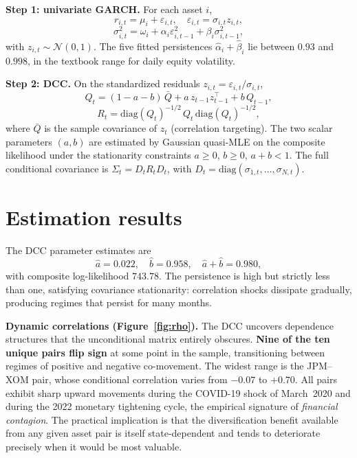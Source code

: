 \documentclass[a4paper,9pt,twocolumn]{extarticle}
\begin{document}
\textbf{Step 1: univariate GARCH.} For each asset $i$,
\begin{equation*}
r_{i,t} = \mu_i + \varepsilon_{i,t}, \quad \varepsilon_{i,t} = \sigma_{i,t} z_{i,t},
\end{equation*}
\begin{equation*}
\sigma_{i,t}^2 = \omega_i + \alpha_i\varepsilon_{i,t-1}^2 + \beta_i\sigma_{i,t-1}^2,
\end{equation*}
with $z_{i,t} \sim \mathcal{N}(0,1)$. The five fitted persistences $\hat\alpha_i + \hat\beta_i$ lie between $0.93$ and $0.998$, in the textbook range for daily equity volatility.

\textbf{Step 2: DCC.} On the standardized residuals $z_{i,t} = \varepsilon_{i,t}/\sigma_{i,t}$,
\begin{equation*}
Q_t = (1-a-b)\,\bar Q + a\, z_{t-1} z_{t-1}^{\top} + b\, Q_{t-1},
\end{equation*}
\begin{equation*}
R_t = \mathrm{diag}(Q_t)^{-1/2}\, Q_t\, \mathrm{diag}(Q_t)^{-1/2},
\end{equation*}
where $\bar Q$ is the sample covariance of $z_t$ (correlation targeting). The two scalar parameters $(a,b)$ are estimated by Gaussian quasi-MLE on the composite likelihood under the stationarity constraints $a\geq 0$, $b\geq 0$, $a+b<1$. The full conditional covariance is $\Sigma_t = D_t R_t D_t$, with $D_t = \mathrm{diag}(\sigma_{1,t},\ldots,\sigma_{N,t})$.

\section{Estimation results}
The DCC parameter estimates are
\[
\hat a = 0.022,\quad \hat b = 0.958,\quad \hat a + \hat b = 0.980,
\]
with composite log-likelihood $743.78$. The persistence is high but strictly less than one, satisfying covariance stationarity: correlation shocks dissipate gradually, producing regimes that persist for many months.

\textbf{Dynamic correlations (Figure~\ref{fig:rho}).} The DCC uncovers dependence structures that the unconditional matrix entirely obscures. \textbf{Nine of the ten unique pairs flip sign} at some point in the sample, transitioning between regimes of positive and negative co-movement. The widest range is the JPM--XOM pair, whose conditional correlation varies from $-0.07$ to $+0.70$. All pairs exhibit sharp upward movements during the COVID-19 shock of March~2020 and during the 2022 monetary tightening cycle, the empirical signature of \textit{financial contagion}. The practical implication is that the diversification benefit available from any given asset pair is itself state-dependent and tends to deteriorate precisely when it would be most valuable.
\end{document}
